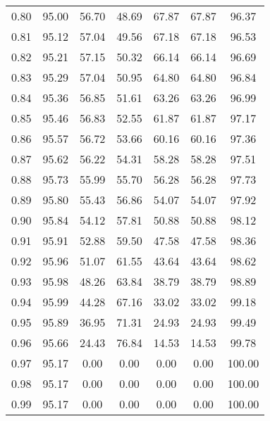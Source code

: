 \begin{tabular}{|c|c|c|c|c|c|c|}
      0.80 &     95.00 &     56.70 &      48.69 &   67.87 &      67.87 &         96.37 \\
      0.81 &     95.12 &     57.04 &      49.56 &   67.18 &      67.18 &         96.53 \\
      0.82 &     95.21 &     57.15 &      50.32 &   66.14 &      66.14 &         96.69 \\
      0.83 &     95.29 &     57.04 &      50.95 &   64.80 &      64.80 &         96.84 \\
      0.84 &     95.36 &     56.85 &      51.61 &   63.26 &      63.26 &         96.99 \\
      0.85 &     95.46 &     56.83 &      52.55 &   61.87 &      61.87 &         97.17 \\
      0.86 &     95.57 &     56.72 &      53.66 &   60.16 &      60.16 &         97.36 \\
      0.87 &     95.62 &     56.22 &      54.31 &   58.28 &      58.28 &         97.51 \\
      0.88 &     95.73 &     55.99 &      55.70 &   56.28 &      56.28 &         97.73 \\
      0.89 &     95.80 &     55.43 &      56.86 &   54.07 &      54.07 &         97.92 \\
      0.90 &     95.84 &     54.12 &      57.81 &   50.88 &      50.88 &         98.12 \\
      0.91 &     95.91 &     52.88 &      59.50 &   47.58 &      47.58 &         98.36 \\
      0.92 &     95.96 &     51.07 &      61.55 &   43.64 &      43.64 &         98.62 \\
      0.93 &     95.98 &     48.26 &      63.84 &   38.79 &      38.79 &         98.89 \\
      0.94 &     95.99 &     44.28 &      67.16 &   33.02 &      33.02 &         99.18 \\
      0.95 &     95.89 &     36.95 &      71.31 &   24.93 &      24.93 &         99.49 \\
      0.96 &     95.66 &     24.43 &      76.84 &   14.53 &      14.53 &         99.78 \\
      0.97 &     95.17 &      0.00 &       0.00 &    0.00 &       0.00 &        100.00 \\
      0.98 &     95.17 &      0.00 &       0.00 &    0.00 &       0.00 &        100.00 \\
      0.99 &     95.17 &      0.00 &       0.00 &    0.00 &       0.00 &        100.00 \\
\bottomrule
\end{tabular}
